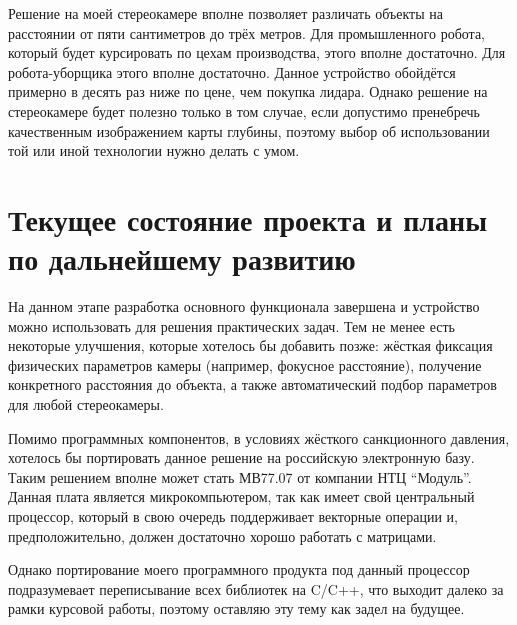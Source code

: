 Решение на моей стереокамере вполне позволяет различать объекты на расстоянии от пяти сантиметров до трёх метров. Для промышленного робота, который будет курсировать по цехам производства, этого вполне достаточно. Для робота-уборщика этого вполне достаточно. Данное устройство обойдётся примерно в десять раз ниже по цене, чем покупка лидара. Однако решение на стереокамере будет полезно только в том случае, если допустимо пренебречь качественным изображением карты глубины, поэтому выбор об использовании той или иной технологии нужно делать с умом. 




\section{Текущее состояние проекта и планы по дальнейшему развитию}

На данном этапе разработка основного функционала завершена и устройство можно использовать для решения практических задач. Тем не менее есть некоторые улучшения, которые хотелось бы добавить позже: жёсткая фиксация физических параметров камеры (например, фокусное расстояние), получение конкретного расстояния до объекта, а также автоматический подбор параметров для любой стереокамеры.

Помимо программных компонентов, в условиях жёсткого санкционного давления, хотелось бы портировать данное решение на российскую электронную базу. Таким решением вполне может стать МВ77.07 от компании НТЦ \enquote{Модуль}. Данная плата является микрокомпьютером, так как имеет свой центральный процессор, который в свою очередь поддерживает векторные операции и, предположительно, должен достаточно хорошо работать с матрицами.


Однако портирование моего программного продукта под данный процессор подразумевает переписывание всех библиотек на C/C++, что выходит далеко за рамки курсовой работы, поэтому оставляю эту тему как задел на будущее.
